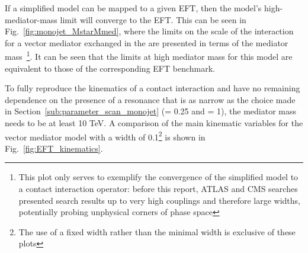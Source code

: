 If a simplified model can be mapped to a given EFT, then the model's high-mediator-mass limit 
will converge to the EFT. This can be seen in Fig.~\ref{fig:monojet_MstarMmed}, where the limits on 
the scale of the interaction for a vector mediator exchanged in the \schannel are presented in terms of the mediator 
mass~\footnote{This plot only serves to exemplify the convergence of the simplified model to a contact
	interaction operator: before this report, ATLAS and CMS searches presented search results up to very high couplings
	and therefore large widths, potentially probing unphysical corners of phase space}. 
It can be seen that the limits at high mediator mass for this model are equivalent to those of the corresponding EFT benchmark. 

To fully reproduce the kinematics of a contact interaction and have no remaining dependence on the presence of a resonance
that is as narrow as the choice made in Section~\ref{sub:parameter_scan_monojet} (\gq = 0.25 and \gDM = 1),
the mediator mass needs to be at least 10 TeV. A comparison of the main kinematic variables for the \schannel vector 
mediator model with a width of 0.1\mMed \footnote{The use of a fixed width rather than the minimal width is exclusive of these plots} 
is shown in Fig.~\ref{fig:EFT_kinematics}.


